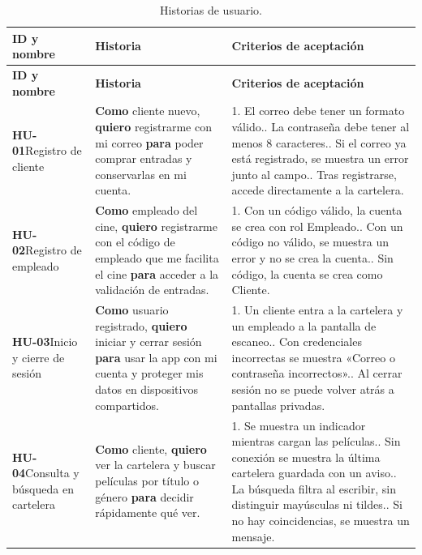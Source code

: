 \documentclass[11pt,a4paper]{article}
\begin{document}
\begin{longtable}{L{2.8cm} L{5.8cm} L{6.1cm}}
\caption{Historias de usuario.}\label{tab:hu}\\
\toprule
\textbf{ID y nombre} & \textbf{Historia} & \textbf{Criterios de aceptación} \\
\midrule
\endfirsthead
\toprule
\textbf{ID y nombre} & \textbf{Historia} & \textbf{Criterios de aceptación} \\
\midrule
\endhead
\bottomrule
\endlastfoot

\textbf{HU-01}\newline Registro de cliente & \textbf{Como} cliente nuevo, \textbf{quiero} registrarme con mi correo \textbf{para} poder comprar entradas y conservarlas en mi cuenta. & 1. El correo debe tener un formato válido.. La contraseña debe tener al menos 8 caracteres.. Si el correo ya está registrado, se muestra un error junto al campo.. Tras registrarse, accede directamente a la cartelera. \\
\midrule
\textbf{HU-02}\newline Registro de empleado & \textbf{Como} empleado del cine, \textbf{quiero} registrarme con el código de empleado que me facilita el cine \textbf{para} acceder a la validación de entradas. & 1. Con un código válido, la cuenta se crea con rol Empleado.. Con un código no válido, se muestra un error y no se crea la cuenta.. Sin código, la cuenta se crea como Cliente. \\
\midrule
\textbf{HU-03}\newline Inicio y cierre de sesión & \textbf{Como} usuario registrado, \textbf{quiero} iniciar y cerrar sesión \textbf{para} usar la app con mi cuenta y proteger mis datos en dispositivos compartidos. & 1. Un cliente entra a la cartelera y un empleado a la pantalla de escaneo.. Con credenciales incorrectas se muestra «Correo o contraseña incorrectos».. Al cerrar sesión no se puede volver atrás a pantallas privadas. \\
\midrule
\textbf{HU-04}\newline Consulta y búsqueda en cartelera & \textbf{Como} cliente, \textbf{quiero} ver la cartelera y buscar películas por título o género \textbf{para} decidir rápidamente qué ver. & 1. Se muestra un indicador mientras cargan las películas.. Sin conexión se muestra la última cartelera guardada con un aviso.. La búsqueda filtra al escribir, sin distinguir mayúsculas ni tildes.. Si no hay coincidencias, se muestra un mensaje. \\

\end{longtable}
\end{document}
